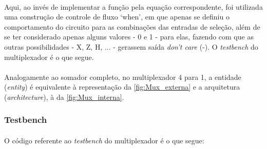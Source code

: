 \documentclass[a4paper,12pt]{article}
\begin{document}
\paragraph{}
Aqui, ao invés de implementar a função pela equação correspondente, foi utilizada uma construção de controle de fluxo `when', em que apenas se definiu o comportamento do circuito para as combinações das entradas de seleção, além de se ter considerado apenas alguns valores - 0 e 1 - para elas, fazendo com que as outras possibilidades - X, Z, H, ... - gerassem saída \textit{don't care} (-). O \textit{testbench} do multiplexador é o que segue.

\paragraph{}
Analogamente ao somador completo, no multiplexador 4 para 1, a entidade (\textit{entity}) é equivalente à representação da \autoref{fig:Mux_externa} e a arquitetura (\textit{architecture}), à da \autoref{fig:Mux_interna}.

\subsubsection{Testbench}
\paragraph{}
O código referente ao \textit{testbench} do multiplexador é o que segue:
\end{document}
